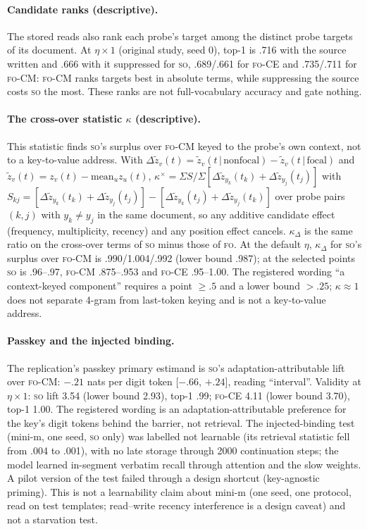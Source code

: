 \documentclass[11pt]{article}
\newcommand{\FO}{\textsc{fo}}
\newcommand{\SO}{\textsc{so}}
\begin{document}
\paragraph{Candidate ranks (descriptive).} The stored reads also rank each probe's target among the
distinct probe targets of its document. At $\eta\times1$ (original study, seed 0), top-1 is .716 with
the source written and .666 with it suppressed for \SO, .689/.661 for \FO-CE{} and .735/.711 for
\FO-CM: \FO-CM{} ranks targets best in absolute terms, while suppressing the source costs \SO{} the
most. These ranks are not full-vocabulary accuracy and gate nothing.

\paragraph{The cross-over statistic $\kappa$ (descriptive).} This statistic finds \SO's surplus over
\FO-CM{} keyed to the probe's own context, not to a key-to-value address. With
$\Delta\tilde z_v(t)=\tilde z_v(t\,|\,\text{nonfocal})-\tilde z_v(t\,|\,\text{focal})$ and
$\tilde z_v(t)=z_v(t)-\mathrm{mean}_u z_u(t)$, $\kappa^{\times}=\Sigma S/\Sigma[\Delta\tilde
z_{y_k}(t_k)+\Delta\tilde z_{y_j}(t_j)]$ with
$S_{kj}=[\Delta\tilde z_{y_k}(t_k)+\Delta\tilde z_{y_j}(t_j)]-[\Delta\tilde z_{y_k}(t_j)+\Delta\tilde
z_{y_j}(t_k)]$ over probe pairs $(k,j)$ with $y_k\ne y_j$ in the same document, so any additive
candidate effect (frequency, multiplicity, recency) and any position effect cancels. $\kappa_\Delta$ is
the same ratio on the cross-over terms of \SO{} minus those of \FO. At the default $\eta$,
$\kappa_\Delta$ for \SO's surplus over \FO-CM{} is .990/1.004/.992 (lower bound .987); at the selected
points \SO{} is .96--.97, \FO-CM{} .875--.953 and \FO-CE{} .95--1.00. The registered wording ``a
context-keyed component'' requires a point $\ge.5$ and a lower bound $>.25$; $\kappa\approx1$ does
not separate 4-gram from last-token keying and is not a key-to-value address.

\paragraph{Passkey and the injected binding.} The replication's passkey primary estimand is \SO's
adaptation-attributable lift over \FO-CM: $-.21$ nats per digit token [$-.66$, $+.24$], reading
``interval''. Validity at $\eta\times1$: \SO{} lift 3.54 (lower bound 2.93), top-1 .99; \FO-CE{} 4.11
(lower bound 3.70), top-1 1.00. The registered wording is an adaptation-attributable preference
for the key's digit tokens behind the barrier, not retrieval. The injected-binding test (mini-m, one seed,
\SO{} only) was labelled not learnable (its retrieval statistic fell from .004 to .001), with no late
storage through 2000 continuation steps; the model learned in-segment verbatim recall through
attention and the slow weights. A pilot version of the test failed through a design shortcut
(key-agnostic priming). This is not a learnability claim about mini-m (one seed, one protocol, read on
test templates; read--write recency interference is a design caveat) and not a starvation test.
\end{document}
